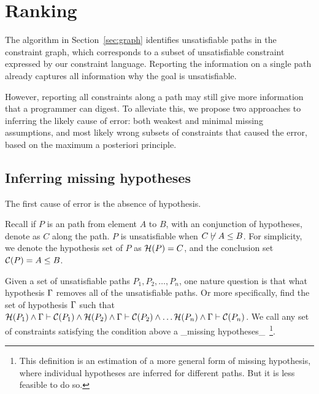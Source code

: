 % 
% 
% 
% 
% 
% 
\section{Ranking}
\label{sec:ranking}

The algorithm in Section~\ref{sec:graph} identifies unsatisfiable paths in the
constraint graph, which corresponds to a subset of unsatisfiable constraint
expressed by our constraint language. Reporting the information on a single
path already captures all information why the goal is unsatisfiable.

However, reporting all constraints along a path may still give more
information that a programmer can digest. To alleviate this, we
propose two approaches to inferring the likely cause of error: both
weakest and minimal missing assumptions, and most likely wrong subsets
of constraints that caused the error, based on the maximum a posteriori
principle.
 
\subsection{Inferring missing hypotheses}
\label{sec:assumptions}

The first cause of error is the absence of hypothesis.

Recall if $P$ is an path from element $A$ to $B$, with an conjunction
of hypotheses, denote as $C$ along the path. $P$ is unsatisfiable when
$C\not\vdash A\leq B$. For simplicity, we denote the hypothesis set
of $P$ as $\mathcal{H}(P)=C$, and the conclusion set
$\mathcal{C}(P)=A\leq B$.

Given a set of unsatisfiable paths $P_1, P_2, \dots,  P_n$, one nature
question is that what hypothesis $\Gamma$ removes all of the unsatisfiable
paths. Or more specifically, find the set of hypothesis $\Gamma$ such that 
%
$\mathcal{H}(P_1) \land \Gamma \vdash \mathcal{C}(P_1) \land
\mathcal{H}(P_2) \land \Gamma \vdash \mathcal{C}(P_2) \land \dots
\mathcal{H}(P_n) \land \Gamma \vdash \mathcal{C}(P_n)$.
%
We call any set of constraints satisfying the condition above a
_missing hypotheses_~\footnote{This definition is an estimation of a
more general form of missing hypothesis, where individual hypotheses
are inferred for different paths. But it is less feasible to do so.}.

